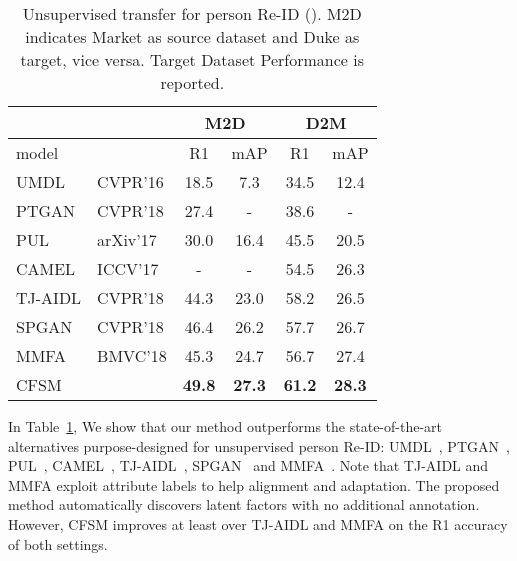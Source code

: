 \documentclass[letterpaper]{article} \usepackage{aaai19}  \usepackage{times}  \usepackage{helvet}  \usepackage{courier}  \usepackage{url}  \usepackage{graphicx}
\begin{document}
\begin{table}[t]
\centering
\small
\begin{tabular}{ll|cc|cc}
\hline
\multicolumn{1}{c}{} & \multicolumn{1}{c|}{} & \multicolumn{2}{c|}{M2D} & \multicolumn{2}{c}{D2M} \\ \hline
model      &           & R1          & mAP         & R1           & mAP         \\ \hline
UMDL       &  CVPR'16     &     18.5    &    7.3     &     34.5     &    12.4     \\
PTGAN      &  CVPR'18     &     27.4        &     -        &  38.6            &    -         \\
PUL        &  arXiv'17    &     30.0    &    16.4     &     45.5     &   20.5      \\
CAMEL      &  ICCV'17     &     -    &      -   &     54.5     &   26.3      \\
TJ-AIDL    &  CVPR'18         & 44.3        & 23.0        & 58.2         & 26.5        \\
SPGAN      &  CVPR'18         & 46.4        & 26.2        & 57.7         & 26.7        \\ 
MMFA       &  BMVC'18   &      45.3       &   24.7          &   56.7           &  27.4           \\ \hline
CFSM       &            & {\bf 49.8}        & {\bf  27.3}        & {\bf 61.2}         & {\bf 28.3}        \\ \hline
\end{tabular}
\caption{Unsupervised transfer for person Re-ID (). M2D indicates Market as  source dataset and Duke as target, vice versa. Target Dataset Performance is reported.}
\label{tab:Unsup_ReID}
\end{table}

In Table~\ref{tab:Unsup_ReID}, We show that our method outperforms the state-of-the-art alternatives purpose-designed for unsupervised person Re-ID: UMDL~\cite{peng2016unsupervised}, PTGAN~\cite{wei2017_trans_GAN}, PUL~\cite{fan2017unsupervised_reid}, CAMEL~\cite{yu2017cross}, TJ-AIDL~\cite{attr_label_transfer_2018wang}, SPGAN~\cite{deng2017image-image} and MMFA~\cite{lin2018multi}.
Note that TJ-AIDL and MMFA exploit attribute labels to help alignment and adaptation. The proposed method automatically discovers latent factors with no additional annotation. However, CFSM improves at least  over TJ-AIDL and MMFA on the R1 accuracy of both settings.
\end{document}
